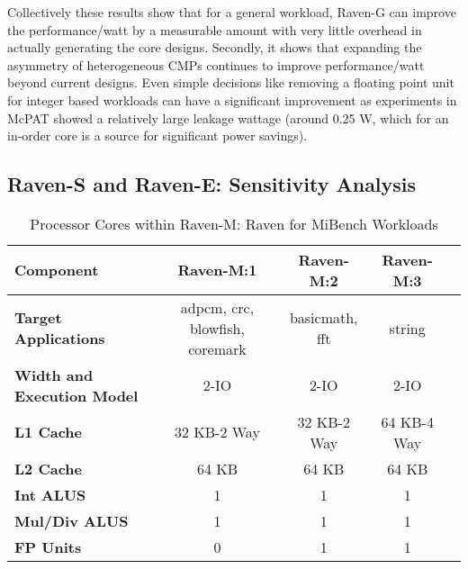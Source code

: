 Collectively these results show that for a general workload, Raven-G
can improve the performance/watt by a measurable amount with very
little overhead in actually generating the core designs. Secondly, it
shows that expanding the asymmetry of heterogeneous CMPs continues to
improve performance/watt beyond current designs. Even simple decisions
like removing a floating point unit for integer based workloads can
have a significant improvement as experiments in McPAT showed a
relatively large leakage wattage (around 0.25 W, which for an in-order
core is a source for significant power savings). 
\subsection{Raven-S and Raven-E: Sensitivity Analysis}
\begin{center}
\begin{table*}[ht]
{\small
\hfill{}
\begin{tabular}{|l|c|c|c|c|}
\hline
\textbf{Component}&\textbf{Raven-M:1}&\textbf{Raven-M:2}&\textbf{Raven-M:3}\\
\hline
\textbf{Target Applications}&adpcm, crc, blowfish, coremark&basicmath, fft&string\\
\hline
\textbf{Width and Execution Model}&2-IO&2-IO&2-IO\\
\hline
\textbf{L1 Cache}&32 KB-2 Way&32 KB-2 Way&64 KB-4 Way\\
\hline
\textbf{L2 Cache}&64 KB&64 KB&64 KB\\
\hline
\textbf{Int ALUS}&1&1&1\\
\hline
\textbf{Mul/Div ALUS}&1&1&1\\
\hline
\textbf{FP Units}&0&1&1\\
\hline
\end{tabular}}
\hfill{}
\caption{Processor Cores within Raven-M: Raven for MiBench Workloads}
\label{table:ravenm}
\end{table*}
\end{center}


